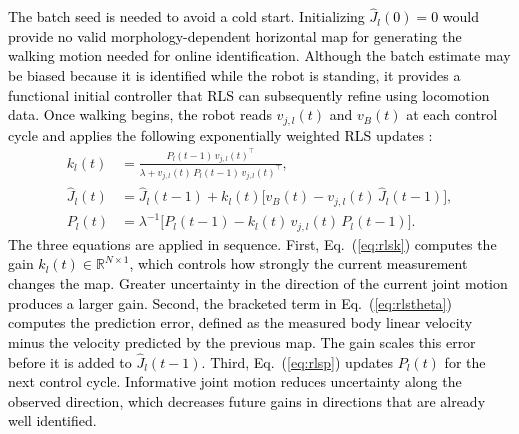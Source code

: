\documentclass[a4paper, 10pt, conference]{ieeeconf}
\newcommand{\vB}{v_B}
\newcommand{\Jm}{J}
\newcommand{\oldtext}[1]{\textcolor{red}{}}
\newcommand{\newtext}[1]{\textcolor{black}{#1}}
\begin{document}
\newtext{The batch seed is needed to avoid a cold start. Initializing
$\hat{\Jm}_l(0)=0$ would provide no valid morphology-dependent horizontal map
for generating the walking motion needed for online identification. Although
the batch estimate may be biased because it is identified while the robot is
standing, it provides a functional initial controller that RLS can subsequently
refine using locomotion data.}
\newtext{Once walking begins, the robot reads $v_{j,l}(t)$ and $\vB(t)$ at each
control cycle and applies the following exponentially weighted RLS updates
\cite{ljung1999,astrom1995}:}
\begin{align}
  k_l(t) &= \frac{P_l(t-1)\,
                 v_{j,l}(t)^{\top}}
                 {\lambda +
                 v_{j,l}(t)\,P_l(t-1)\,
                 v_{j,l}(t)^{\top}},
  \label{eq:rlsk}\\
  \hat{\Jm}_l(t) &= \hat{\Jm}_l(t-1)
       + k_l(t)\bigl[\vB(t) -
       v_{j,l}(t)\,\hat{\Jm}_l(t-1)\bigr],
  \label{eq:rlstheta}\\
  P_l(t) &= \lambda^{-1}\bigl[P_l(t-1) - k_l(t)\,
       v_{j,l}(t)\,P_l(t-1)\bigr].
  \label{eq:rlsp}
\end{align}
\newtext{The three equations are applied in sequence. First,
Eq.~(\ref{eq:rlsk}) computes the gain
$k_l(t)\in\mathbb{R}^{N\times1}$, which controls how strongly the current
measurement changes the map. Greater uncertainty in the direction of the
current joint motion produces a larger gain. Second, the bracketed term in
Eq.~(\ref{eq:rlstheta}) computes the prediction error, defined as the measured
body linear velocity minus the velocity predicted by the previous map. The gain
scales this error before it is added to $\hat{\Jm}_l(t-1)$. Third,
Eq.~(\ref{eq:rlsp}) updates $P_l(t)$ for the next control cycle. Informative
joint motion reduces uncertainty along the observed direction, which decreases
future gains in directions that are already well identified.}
\end{document}
